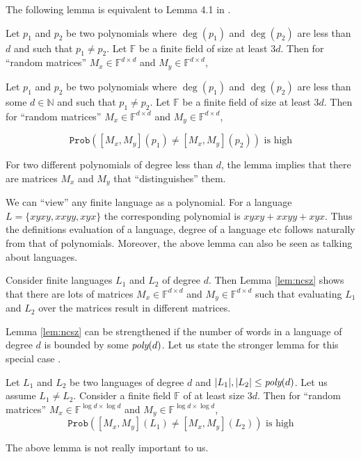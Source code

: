 \documentclass[english,course]{lecture}
\newcommand{\Mxy}[1]{[M_x,M_y](#1)}
\newcommand{\degree}[1]{\deg(#1)}
\newcommand{\field}{\mathbb{F}}
\newcommand{\poly}[1]{\emph{poly}(#1)}
\newcommand{\Prob}[1]{\ensuremath{\mathtt{Prob}(#1)}}
\begin{document}
The following lemma is equivalent to Lemma 4.1 in \cite{bw}.
\begin{lemma}
\label{lem:ncsz}

Let $p_1$ and $p_2$ be two polynomials where $\degree {p_1}$ and $\degree {p_2}$ are less than $d$ and such that $p_1 \neq p_2$. Let $\field$ be a finite field of size at least $3d$. Then for ``random matrices'' $M_x \in \field^{d \times d}$ and $M_y \in \field^{d \times d}$, 

Let $p_1$ and $p_2$ be two polynomials where $\degree {p_1}$ and $\degree {p_2}$ are less than some $d\in\mathbb{N}$ and such that $p_1 \neq p_2$. Let $\field$ be a finite field of size at least $3d$. Then for ``random matrices'' $M_x \in \field^{d \times d}$ and $M_y \in \field^{d \times d}$, 

\[
\Prob{\Mxy {p_1} \neq \Mxy {p_2}} \text{ is high}
\]
\end{lemma}

For two different polynomials of degree less than $d$, the lemma implies that there are matrices $M_x$ and $M_y$ that ``distinguishes'' them. 

We can ``view'' any finite language as a polynomial. For a language $L = \{xyxy, xxyy, xyx\}$ the corresponding polynomial is $xyxy + xxyy + xyx$. Thus the definitions evaluation of a language, degree of a language etc follows naturally from that of polynomials. Moreover, the above lemma can also be seen as talking about languages.

Consider finite languages $L_1$ and $L_2$ of degree $d$. Then Lemma \ref{lem:ncsz} shows that there are lots of matrices $M_x \in \field^{d \times d}$ and $M_y \in \field^{d \times d}$ such that evaluating $L_1$ and $L_2$ over the matrices result in different matrices.

Lemma \ref{lem:ncsz} can be strengthened if the number of words in a language of degree $d$ is bounded by some $\poly d$. Let us state the stronger lemma for this special case \cite{arvind}.

\begin{lemma}
\label{lem:strongncsz}
Let $L_1$ and $L_2$ be two languages of degree $d$ and $|L_1|, |L_2| \leq \poly d$. Let us assume $L_1 \neq L_2$. Consider a finite field $\field$ of at least size $3d$. Then for ``random matrices'' $M_x \in \field^{\log d \times \log d}$ and $M_y \in \field^{\log d \times \log d}$, 
\[
\Prob{\Mxy {L_1} \neq \Mxy {L_2}} \text{ is high}
\]
\end{lemma}
The above lemma is not really important to us. 
\end{document}
